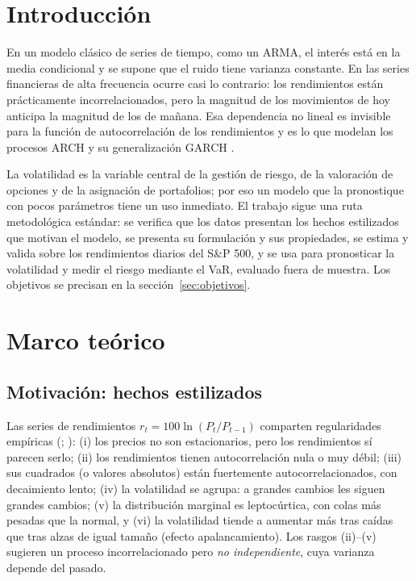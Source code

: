 \documentclass[legalpaper,11pt]{article}
\begin{document}
\section{Introducción}

En un modelo clásico de series de tiempo, como un ARMA, el interés está en la media
condicional y se supone que el ruido tiene varianza constante. En las series financieras de
alta frecuencia ocurre casi lo contrario: los rendimientos están prácticamente incorrelacionados,
pero la magnitud de los movimientos de hoy anticipa la magnitud de los de mañana. Esa dependencia
no lineal es invisible para la función de autocorrelación de los rendimientos y es lo que
modelan los procesos ARCH \citep{engle1982} y su generalización GARCH \citep{bollerslev1986}.

La volatilidad es la variable central de la gestión de riesgo, de la valoración de opciones y
de la asignación de portafolios; por eso un modelo que la pronostique con pocos parámetros
tiene un uso inmediato. El trabajo sigue una ruta metodológica estándar: se verifica que los
datos presentan los hechos estilizados que motivan el modelo, se presenta su formulación y
sus propiedades, se estima y valida sobre los rendimientos diarios del S\&P 500, y se usa
para pronosticar la volatilidad y medir el riesgo mediante el VaR, evaluado fuera de muestra.
Los objetivos se precisan en la sección~\ref{sec:objetivos}.

\section{Marco teórico}

\subsection{Motivación: hechos estilizados}
Las series de rendimientos $r_t=100\ln(P_t/P_{t-1})$ comparten regularidades empíricas
(\citealp{rossi2013}; \citealp[cap.~1]{francq2010}): (i) los precios no son estacionarios, pero los rendimientos sí
parecen serlo; (ii) los rendimientos tienen autocorrelación nula o muy débil; (iii) sus
cuadrados (o valores absolutos) están fuertemente autocorrelacionados, con decaimiento lento;
(iv) la volatilidad se agrupa: a grandes cambios les siguen grandes cambios; (v) la
distribución marginal es leptocúrtica, con colas más pesadas que la normal, y (vi) la
volatilidad tiende a aumentar más tras caídas que tras alzas de igual tamaño (efecto
apalancamiento). Los rasgos (ii)--(v) sugieren un proceso incorrelacionado pero
\emph{no independiente}, cuya varianza depende del pasado.
\end{document}

